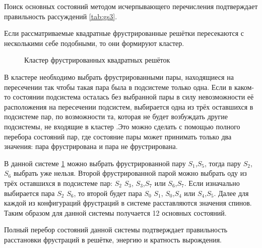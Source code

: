 \documentclass[utf8, babel, sor, jor, amsmath, amssymb, reprint]{elsarticle} %
\begin{document}
Поиск основных состояний методом исчерпывающего перечисления подтверждает правильность рассуждений \eqref{tab:gs3}.

Если рассматриваемые квадратные фрустрированные решётки пересекаются с несколькими себе подобными, то они формируют кластер.

\begin{figure}[h]
	\centering
	\caption{Кластер фрустрированных квадратных решёток}
	\label{fig:cluster}
\end{figure}

В кластере необходимо выбрать фрустрированными пары, находящиеся на пересечении так чтобы такая пара была в подсистеме только одна. Если в каком-то состоянии подсистема осталась без выбранной пары в силу невозможности её расположения на пересечении подсистем, выбирается одна из трёх оставшихся в подсистеме пар, по возможности та, которая не будет возбуждать другие подсистемы, не входящие в кластер .Это можно сделать с помощью полного перебора состояний пар, где состояние пары может принимать только два значения: пара фрустрирована и пара не фрустрирована.

В данной системе \ref{fig:cluster} можно выбрать фрустрированной пару $S_1$,$S_5$, тогда пару  $S_2$,$S_6$ выбрать уже нельзя. Второй фрустрированной парой можно выбрать оду из трёх оставшихся в подсистеме пар: $S_2$ $S_3$, $S_3$,$S_7$ или $S_6$,$S_7$. Если изначально выбирается пара $S_2$ $S_6$, то второй будет пара $S_0$ $S_1$, $S_0$,$S_4$ или $S_4$,$S_5$. Далее для каждой из конфигураций фрустраций в системе расставляются значения спинов. Таким образом для данной системы получается 12 основных состояний.

Полный перебор состояний данной системы подтверждает правильность расстановки фрустраций в решётке, энергию и кратность вырождения.
\end{document}
